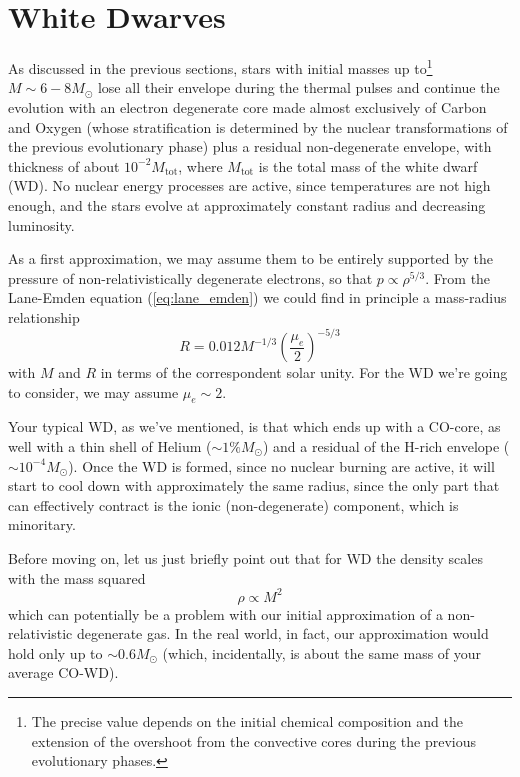 \section{White Dwarves}

As discussed in the previous sections, stars with initial masses up to\footnote{The precise value depends on the initial chemical composition and the extension of the overshoot from the convective cores during the previous evolutionary phases.} $M\sim 6-8M_{\odot}$ lose all their envelope during the thermal pulses and continue the evolution with an electron degenerate core made almost exclusively of Carbon and Oxygen (whose stratification is determined by the nuclear transformations of the previous evolutionary phase) plus a residual non-degenerate envelope, with thickness of about $10^{-2}M_{\text{tot}}$, where $M_{\text{tot}}$ is the total mass of the white dwarf (WD). No nuclear energy processes are active, since temperatures are not high enough, and the stars evolve at approximately constant radius and decreasing luminosity.
\par As a first approximation, we may assume them to be entirely supported by the pressure of non-relativistically degenerate electrons, so that $p \propto \rho^{5/3}$. From the Lane-Emden equation (\ref{eq:lane_emden}) we could find in principle a mass-radius relationship
\begin{equation}
    R = 0.012M^{-1/3}\left(\frac{\mu_{e}}{2}\right)^{-5/3}
\end{equation}
with $M$ and $R$ in terms of the correspondent solar unity. For the WD we're going to consider, we may assume $\mu_{e}\sim 2$.
\par Your typical WD, as we've mentioned, is that which ends up with a CO-core, as well with a thin shell of Helium ($\sim 1\%M_{\odot}$) and a residual of the H-rich envelope ($\sim 10^{-4}M_{\odot}$). Once the WD is formed, since no nuclear burning are active, it will start to cool down with approximately the same radius, since the only part that can effectively contract is the ionic (non-degenerate) component, which is minoritary.
\par Before moving on, let us just briefly point out that for WD the density scales with the mass squared
\begin{equation*}
    \rho \propto M^{2}
\end{equation*}
which can potentially be a problem with our initial approximation of a non-relativistic degenerate gas. In the real world, in fact, our approximation would hold only up to $\sim 0.6M_{\odot}$ (which, incidentally, is about the same mass of your average CO-WD).
